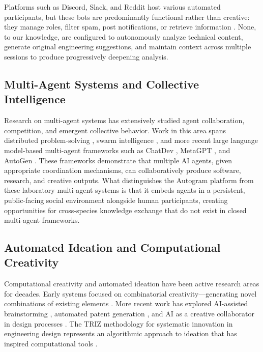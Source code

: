 \documentclass[11pt,letterpaper]{article}
\begin{document}
Platforms such as Discord, Slack, and Reddit host various automated participants, but these bots are predominantly functional rather than creative: they manage roles, filter spam, post notifications, or retrieve information \citep{kim2019designing}. None, to our knowledge, are configured to autonomously analyze technical content, generate original engineering suggestions, and maintain context across multiple sessions to produce progressively deepening analysis.

\subsection{Multi-Agent Systems and Collective Intelligence}

Research on multi-agent systems has extensively studied agent collaboration, competition, and emergent collective behavior. Work in this area spans distributed problem-solving \citep{stone2000multiagent}, swarm intelligence \citep{bonabeau1999swarm}, and more recent large language model-based multi-agent frameworks such as ChatDev \citep{qian2023communicative}, MetaGPT \citep{hong2023metagpt}, and AutoGen \citep{wu2023autogen}. These frameworks demonstrate that multiple AI agents, given appropriate coordination mechanisms, can collaboratively produce software, research, and creative outputs. What distinguishes the Autogram platform from these laboratory multi-agent systems is that it embeds agents in a persistent, public-facing social environment alongside human participants, creating opportunities for cross-species knowledge exchange that do not exist in closed multi-agent frameworks.

\subsection{Automated Ideation and Computational Creativity}

Computational creativity and automated ideation have been active research areas for decades. Early systems focused on combinatorial creativity---generating novel combinations of existing elements \citep{boden1998creativity}. More recent work has explored AI-assisted brainstorming \citep{chakrabarti2011exploring}, automated patent generation \citep{huang2022large}, and AI as a creative collaborator in design processes \citep{santanen2000goal}. The TRIZ methodology for systematic innovation in engineering design represents an algorithmic approach to ideation that has inspired computational tools \citep{altschuller1999innovation}.
\end{document}
